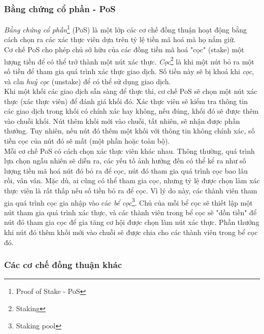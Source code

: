 \subsubsection{Bằng chứng cổ phần - PoS}

\textit{Bằng chứng cổ phần}\footnote{Proof of Stake - PoS} (PoS) là một lớp các cơ chế đồng thuận hoạt động bằng cách chọn ra các xác thực viên dựa trên tỷ lệ tiền mã hoá mà họ nắm giữ.\\

Cơ chế PoS cho phép chủ sở hữu của các đồng tiền mã hoá "cọc" (stake) một lượng tiền để có thể trở thành một nút xác thực. \textit{Cọc}\footnote{Staking} là khi một nút bỏ ra một số tiền để tham gia quá trình xác thực giao dịch. Số tiền này sẽ bị khoá khi \textit{cọc}, và cần \textit{huỷ cọc} (unstake) để có thể sử dụng giao dịch.\\

Khi một khối các giao dịch sẫn sàng để thực thi, cơ chế PoS sẽ chọn một nút xác thực (xác thực viên) để đánh giá khối đó. Xác thực viên sẽ kiểm tra thông tin các giao dịch trong khối có chính xác hay không, nếu đúng, khối đó sẽ được thêm vào chuỗi khối. Nút thêm khối mới vào chuỗi, tất nhiên, sẽ nhận được phần thưởng. Tuy nhiên, nếu nút đó thêm một khối với thông tin không chính xác, số tiền cọc của nút đó sẽ mất (một phần hoặc toàn bộ).\\

Mỗi cơ chế PoS có cách chọn xác thực viên khác nhau. Thông thường, quá trình lựa chọn ngẫu nhiên sẽ diễn ra, các yếu tố ảnh hưởng đến có thể kể ra như số lượng tiền mã hoá nút đó bỏ ra để cọc, nút đó tham gia quá trình cọc bao lâu rồi, vân vân. Mặc dù, ai cũng có thể tham gia cọc, nhưng tỷ lệ được chọn làm xác thực viên là rất thấp nếu số tiền bỏ ra để cọc. Vì lý do này, các thành viên tham gia quá trình cọc gia nhập vào các \textit{bể cọc}\footnote{Staking pool}. Chủ của mỗi bể cọc sẽ thiết lập một nút tham gia quá trình xác thực, và các thành viên trong bể cọc sẽ "dồn tiền" để nút đó tham gia cọc để gia tăng cơ hội được chọn làm nút xác thực. Phần thưởng khi nút đó thêm khối mới vào chuỗi sẽ được chia cho các thành viên trong bể cọc đó.

\subsubsection{Các cơ chế đồng thuận khác}

